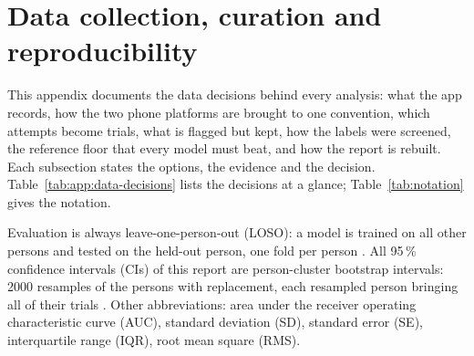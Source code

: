 \section{Data collection, curation and reproducibility}\label{app:data}

This appendix documents the data decisions behind every analysis: what the app records, how the two phone
platforms are brought to one convention, which attempts become trials, what is flagged but kept, how the labels
were screened, the reference floor that every model must beat, and how the report is rebuilt. Each subsection
states the options, the evidence and the decision. Table~\ref{tab:app:data-decisions} lists the decisions at a
glance; Table~\ref{tab:notation} gives the notation.

Evaluation is always leave-one-person-out (LOSO): a model is trained on all other persons and tested on the
held-out person, one fold per person \cite{saeb2017usecase,little2017crossvalidation}. All 95\,\% confidence
intervals (CIs) of this report are person-cluster bootstrap intervals: 2000 resamples of the persons with
replacement, each resampled person bringing all of their trials \cite{saravanan2020bootstrap}. Other
abbreviations: area under the receiver operating characteristic curve (AUC), standard deviation (SD),
standard error (SE), interquartile range (IQR), root mean square (RMS).

